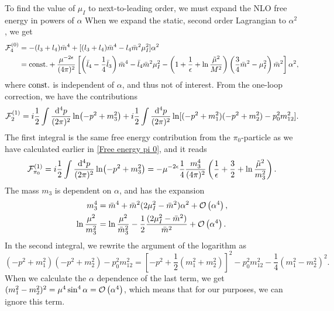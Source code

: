 To find the value of $\mu_I$ to next-to-leading order, we must expand the NLO free energy in powers of $\alpha$
When we expand the static, second order Lagrangian to $\alpha^2$, we get
\begin{align}
    \Ef_4^{(0)}
    &= - (l_3 + l_4)\bar m^4 + [(l_3 + l_4)\bar m^4 -l_4 \bar m^2\mu_I^2]\alpha^2
    \\
    & =
    \const + 
    \frac{\mu^{-2\epsilon}}{(4\pi)^2}
    \left[
        \left(
            \bar l_4 - \frac{1}{4}\bar l_3
        \right)\bar m^4
        -\bar l_4\bar m^2\mu_I^2
        -\left(
            1 + \frac{1}{\epsilon} + \ln\frac{\tilde \mu^2}{M^2}
        \right)
        \left(\frac{3}{4}\bar m^2 - \mu_I^2\right)\bar m^2
    \right]\alpha^2,
\end{align}
where $\const$ is independent of $\alpha$, and thus not of interest.
From the one-loop correction, we have the contributions
\begin{equation}
    \Ef_2^{(1)} = i \frac{1}{2}\int \frac{\dd^4 p}{(2\pi)^2} \ln(-p^2 + m_3^2)
    +  i \frac{1}{2} \int \frac{\dd^4 p}{(2\pi)^2} \ln[(-p^2 + m_1^2)(-p^2 + m_2^2) - p_0^2 m_{12}^2].
\end{equation}
The first integral is the same free energy contribution from the $\pi_0$-particle as we have calculated earlier in \cref{Free energy pi 0}, and it reads
\begin{equation}
    \Ef_{\pi_0}^{(1)}
    = i \frac{1}{2}\int \frac{\dd^4 p}{(2\pi)^2} \ln(-p^2 + m_3^2)
    = - \mu^{-2\epsilon}\frac{1}{4} \frac{m_3^4}{(4 \pi)^2}
    \left(\frac{1}{\epsilon} + \frac{3}{2} + \ln \frac{\tilde \mu^2}{m_3^2}\right).
\end{equation}
The mass $m_3$ is dependent on $\alpha$, and has the expansion
\begin{align*}
    m_3^4
    &= \bar m^4 + \bar m^2(2\mu_I^2 - \bar m^2)\alpha^2+ \Oh[4]{\alpha}, \\
    \ln \frac{\mu^2}{m_3^2}
    &=
    \ln \frac{\mu^2}{\bar m_3^2} - \frac{1}{2} \frac{(2\mu_I^2 - \bar m^2)}{\bar m^2}+ \Oh[4]{\alpha}.
\end{align*}
In the second integral, we rewrite the argument of the logarithm as
\begin{equation}
    (-p^2 + m_1^2)(-p^2 + m_2^2) - p_0^2 m_{12}^2
    =  \left[-p^2 + \frac{1}{2}(m_1^2 + m_2^2)\right]^2 - p_0^2 m_{12}^2 - \frac{1}{4}(m_1^2 - m_2^2)^2.
\end{equation}
When we calculate the $\alpha$ dependence of the last term, we get  $(m_1^2 - m_2^2)^2 = \mu^4 \sin^4\alpha = \Oh[4]{\alpha}$, which means that for our purposes, we can ignore this term.
